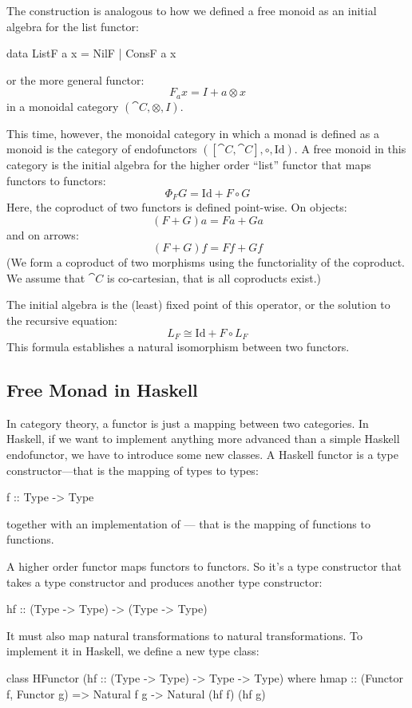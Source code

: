 \documentclass[DaoFP]{subfiles}
\begin{document}
The construction is analogous to how we defined a free monoid as an initial algebra for the list functor:
\begin{haskell}
data ListF a x = NilF | ConsF a x
\end{haskell}
or the more general functor:
\[ F_a x = I + a \otimes x \]
in a monoidal category $(\cat C, \otimes, I)$.

This time, however, the monoidal category in which a monad is defined as a monoid is the category of endofunctors $([\cat C, \cat C], \circ, \text{Id})$. A free monoid in this category is the initial algebra for the higher order ``list'' functor that maps functors to functors:
\[ \Phi_F G = \text{Id} + F \circ G \]
Here, the coproduct of two functors is defined point-wise. On objects:
\[ (F + G) a = F a + G a \]
and on arrows:
\[ (F + G) f = F f + G f \]
(We form a coproduct of two morphisms using the functoriality of the coproduct. We assume that $\cat C$ is co-cartesian, that is all coproducts exist.)


The initial algebra is the (least) fixed point of this operator, or the solution to the recursive equation:
\[ L_F \cong \text{Id} + F \circ L_F \]
This formula establishes a natural isomorphism between two functors. 



\subsection{Free Monad in Haskell}

In category theory, a functor is just a mapping between two categories. In Haskell, if we want to implement anything more advanced than a simple Haskell endofunctor, we have to introduce some new classes. A Haskell functor is a type constructor---that is the mapping of types to types:
\begin{haskell}
f :: Type -> Type
\end{haskell}
together with an implementation of --- that is the mapping of functions to functions. 

A higher order functor maps functors to functors. So it's a type constructor that takes a type constructor and produces another type constructor:
\begin{haskell}
hf :: (Type -> Type) -> (Type -> Type)
\end{haskell}
It must also map natural transformations to natural transformations. To implement it in Haskell, we define a new type class:
\begin{haskell}
class HFunctor (hf :: (Type -> Type) -> Type -> Type) where
   hmap :: (Functor f, Functor g) => 
       Natural f g -> Natural (hf f) (hf g)
\end{haskell}
\end{document}
